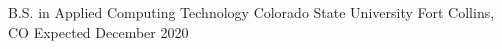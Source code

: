



\begin{cventries}
  \cventry
    {B.S. in Applied Computing Technology} %
    {Colorado State University} %
    {Fort Collins, CO} %
    {Expected December 2020} %
    {}
\end{cventries}
